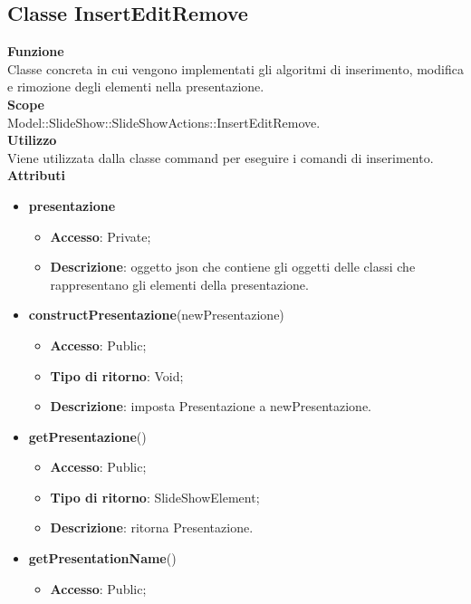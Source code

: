 \subsection{Classe InsertEditRemove}{
		\textbf{Funzione}\\
			\indent Classe concreta in cui vengono implementati gli algoritmi di inserimento, modifica e rimozione degli elementi nella presentazione.\\
	   	\textbf{Scope}\\
			\indent Model::SlideShow::SlideShowActions::InsertEditRemove.\\
		\textbf{Utilizzo}\\
			\indent Viene utilizzata dalla classe command per eseguire i comandi di inserimento.\\
		\textbf{Attributi}
		\begin{itemize}
			\item \textbf{presentazione}
			\begin{itemize}
				\item \textbf{Accesso}: Private;
				\item \textbf{Descrizione}: oggetto json che contiene gli oggetti delle classi che rappresentano gli elementi della presentazione.
			\end{itemize}
		\end{itemize}
		\begin{itemize}
			\item \textbf{constructPresentazione}(newPresentazione)
			\begin{itemize}
				\item \textbf{Accesso}: Public;
				\item \textbf{Tipo di ritorno}: Void;
				\item \textbf{Descrizione}: imposta Presentazione a newPresentazione.
			\end{itemize}
			\item \textbf{getPresentazione}()
			\begin{itemize}
				\item \textbf{Accesso}: Public;
				\item \textbf{Tipo di ritorno}: SlideShowElement;
				\item \textbf{Descrizione}: ritorna Presentazione.
			\end{itemize}
			\item \textbf{getPresentationName}()
			\begin{itemize}
				\item \textbf{Accesso}: Public;

\end{itemize}
\end{itemize}}
